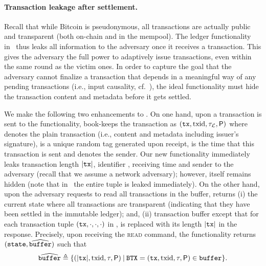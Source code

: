

\paragraph{Transaction leakage after settlement.}
%
Recall that while Bitcoin is pseudonymous, all transactions are actually public and transparent (both on-chain and in the mempool).
%
The ledger functionality in~\cite{C:BMTZ17} thus leaks all information to the adversary once it receives a transaction.
%
This gives the adversary the full power to adaptively issue transactions, even within the same round as the victim ones.
%
In order to capture the goal that the adversary cannot finalize a transaction that depends in a meaningful way of any pending transactions (i.e., input causality, cf.~\cite{C:CKPS01}), the ideal functionality must hide the transaction content and metadata before it gets settled.

We make the following two enhancements to \funcFairLedger.
%
On one hand, upon a transaction is sent to the functionality, \funcFairLedger book-keeps the transaction as $(\mathtt{tx}, \mathrm{txid}, \tau_\mathcal{L}, \mathsf{P})$ where \tx denotes the plain transaction (i.e., content and metadata including issuer's signature), \txid is a unique random tag generated upon receipt, \ledgerTime is the time that this transaction is sent and \party denotes the sender.
%
Our new functionality \funcFairLedger immediately leaks transaction length $|\mathtt{tx}|$, identifier \txid, receiving time \ledgerTime and sender \party to the adversary (recall that we assume a network adversary); however, \tx itself remains hidden (note that in~\cite{C:BMTZ17} the entire tuple is leaked immediately).
%
On the other hand, upon the adversary requests to read all transactions in the buffer, \funcFairLedger returns (i) the current state \state where all transactions are transparent (indicating that they have been settled in the immutable ledger); and, (ii) transaction buffer \buffer except that for each transaction tuple $(\mathtt{tx}, \cdot, \cdot, \cdot)$ in \buffer, \tx is replaced with its length $|\mathtt{tx}|$ in the response.
%
Precisely, upon receiving the \textsc{read} command, the functionality returns $(\mathtt{state}, \widehat{\mathtt{buffer}})$ such that
%
\begin{equation} \label{eq:buffer-fair-ledger}
    \widehat{\mathtt{buffer}} \triangleq \{ (|\mathtt{tx}|, \mathrm{txid}, \tau, \mathsf{P}) \mathbin| \mathtt{BTX} = (\mathtt{tx}, \mathrm{txid}, \tau, \mathsf{P}) \in \mathtt{buffer} \}.
\end{equation}

